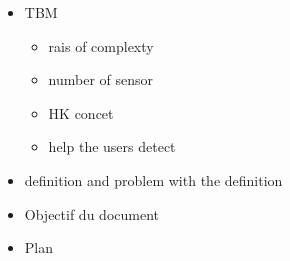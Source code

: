 \documentclass[./intro.tex]{subfiles}
\begin{document}
    \begin{itemize}
        \item TBM
        \begin{itemize}
            \item rais of complexty
            \item number of sensor
            \item HK concet 
            \item help the users detect 
        \end{itemize}
        \item definition and problem with the definition
        \item Objectif du document
        \item Plan
    \end{itemize}
\end{document}
